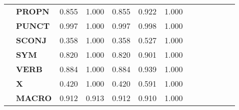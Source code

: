 \begin{longtable}{|l||l||l||l||l||l||l||l||l||l||l||l||l|}
\textbf{} & \textbf{PROPN} & 0.855 & 1.000 & 0.855 & 0.922 & 1.000 \\
\textbf{} & \textbf{PUNCT} & 0.997 & 1.000 & 0.997 & 0.998 & 1.000 \\
\textbf{} & \textbf{SCONJ} & 0.358 & 1.000 & 0.358 & 0.527 & 1.000 \\
\textbf{} & \textbf{SYM} & 0.820 & 1.000 & 0.820 & 0.901 & 1.000 \\
\textbf{} & \textbf{VERB} & 0.884 & 1.000 & 0.884 & 0.939 & 1.000 \\
\textbf{} & \textbf{X} & 0.420 & 1.000 & 0.420 & 0.591 & 1.000 \\
\textbf{} & \textbf{MACRO} & 0.912 & 0.913 & 0.912 & 0.910 & 1.000 \\
\cline{1-7}
\end{longtable}
